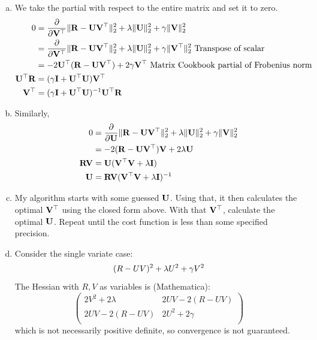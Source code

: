 \documentclass[12pt,letterpaper,fleqn]{hmcpset}
\begin{document}
\begin{solution}
    \begin{enumerate}[(a)]
        \item
            We take the partial with respect to the entire matrix and set it to zero. 
            \begin{align*}
                0 &= \frac{\partial}{\partial {\bf V}^\top} \|{\bf R} - {\bf U}{\bf V}^\top\|_2^2 + \lambda\|{\bf U}\|_2^2 + \gamma\|{\bf V}\|_2^2 \\
                &= \frac{\partial}{\partial {\bf V}^\top} \|{\bf R} - {\bf U} {\bf V}^\top  \|_2^2 + \lambda\|{\bf U}\|_2^2 + \gamma\|{\bf V}^\top \|_2^2 \text{ Transpose of scalar} \\
                &= -2{\bf U}^\top({\bf R} - {\bf U}{\bf V}^\top) + 2\gamma {\bf V}^\top \text{ Matrix Cookbook partial of Frobenius norm} \\
                {\bf U}^\top {\bf R} &= (\gamma {\bf I}  + {\bf U}^\top {\bf U}) {\bf V}^\top  \\
                {\bf V}^\top &= (\gamma {\bf I}  + {\bf U}^\top {\bf U})^{-1} {\bf U}^\top {\bf R}
            \end{align*}
        \item
            Similarly,
            \begin{align*}
                0 &= \frac{\partial}{\partial {\bf U}} \|{\bf R} - {\bf U}{\bf V}^\top\|_2^2 + \lambda\|{\bf U}\|_2^2 + \gamma\|{\bf V}\|_2^2 \\
                &= -2 ({\bf R} - {\bf U}{\bf V}^\top) {\bf V} + 2 \lambda {\bf U} \\
                {\bf R} {\bf V} &= {\bf U} ({\bf V}^\top {\bf V} + \lambda {\bf I}) \\
                {\bf U} &= {\bf R} {\bf V}({\bf V}^\top {\bf V} + \lambda {\bf I})^{-1}
            \end{align*}
        \item
            My algorithm starts with some guessed ${\bf U}$. Using that, it then calculates the optimal ${\bf V}^\top$ using the closed form above. With that ${\bf V}^\top$, calculate the optimal ${\bf U}$. Repeat until the cost function is less than some specified precision.
        \item
            Consider the single variate case:
            $$
                (R-UV)^2 + \lambda U^2 + \gamma V^2\\       
            $$
            The Hessian with $R, V$ as variables is (Mathematica):
            $$\left(
                \begin{array}{cc}
                 2 V^2+2 \lambda  & 2 U V-2 (R-U V) \\
                 2 U V-2 (R-U V) & 2 U^2+2 \gamma  \\
                \end{array}
            \right)$$
            which is not necessarily positive definite, so convergence is not guaranteed.


    \end{enumerate}
\end{solution}
\end{document}
